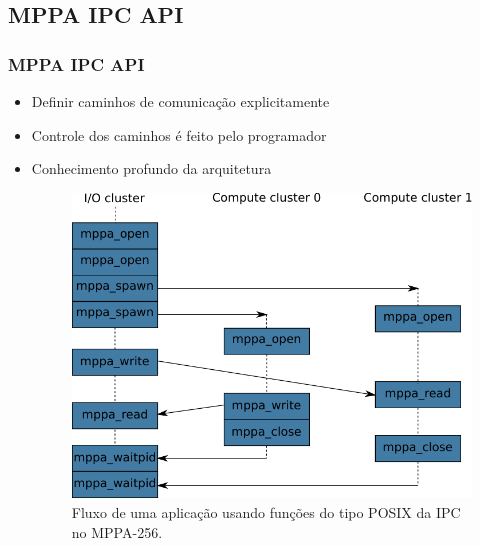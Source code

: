 \documentclass[xcolor={table}]{beamer}
\begin{document}
\subsection{MPPA IPC API}
\begin{frame}\frametitle{MPPA IPC API}
    \begin{itemize}
        \item Definir caminhos de comunicação explicitamente
        \item Controle dos caminhos é feito pelo programador
        \item Conhecimento profundo da arquitetura
        \begin{figure}[tb]
          \centering
          \includegraphics[width=.6\linewidth, keepaspectratio]{figs/mppaipcflow.pdf}
          \caption{Fluxo de uma aplicação usando funções do tipo POSIX da IPC no MPPA-256.}
          \label{fig:mppaipcflow}
        \end{figure}
    \end{itemize}
\end{frame}
\end{document}
